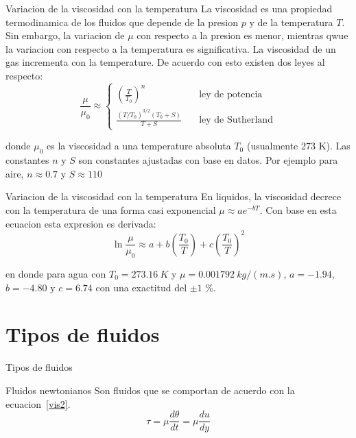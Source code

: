 \documentclass [xcolor=svgnames, t] {beamer}
\begin{document}
\begin{frame}{Variacion de la viscosidad con la temperatura}
La viscosidad es una propiedad termodinamica de los fluidos que depende de la presion $p$ y de la temperatura $T$. Sin embargo, la variacion de $\mu$ con respecto a la presion es menor, mientras qwue la variacion con respecto a la temperatura es significativa.
La viscosidad de un gas incrementa con la temperature. De acuerdo con esto existen dos leyes al respecto:
\begin{equation}
\frac{\mu}{\mu_0} \approx 
\begin{cases}
\left( \frac{T}{T_0} \right)^n & \quad \text{ley de potencia} \\
\frac{(T/T_0 )^{3/2}(T_0 + S)}{T+S} & \quad \text{ley de Sutherland} 
\end{cases}
\label{vist}
\end{equation}

donde $\mu_0$ es la viscosidad a una temperature absoluta $T_0$ (usualmente 273 K). Las constantes $n$ y $S$ son constantes ajustadas con base en datos. Por ejemplo para aire, $n\approx 0.7$ y $S\approx 110$ 
\end{frame}

\begin{frame}{Variacion de la viscosidad con la temperatura}
En liquidos, la viscosidad decrece con la temperatura de una forma casi exponencial $\mu \approx ae^{-bT}$. Con base en esta ecuacion esta expresion es derivada:
\begin{equation}
\ln \frac{\mu}{\mu_0} \approx  a + b \left(\frac{T_0}{T}\right)+ c\left(\frac{T_0}{T}\right)^2
\label{visf}
\end{equation}

en donde para agua con $T_0 = 273.16\ K$ y $\mu = 0.001792\ kg/(m.s)$, $a=-1.94$, $b=-4.80$ y $c=6.74$ con una  exactitud del $\pm 1$ \%.
\end{frame}


\section{Tipos de fluidos}
\begin{frame}{Tipos de fluidos}
\begin{block}{Fluidos newtonianos}
Son fluidos que se comportan de acuerdo con la ecuacion~\ref{vis2}.
\begin{equation}
\tau = \mu \frac{d \theta}{d t} = \mu \frac{d u}{d y}
\end{equation}

\end{block}
\end{frame}
\end{document}

